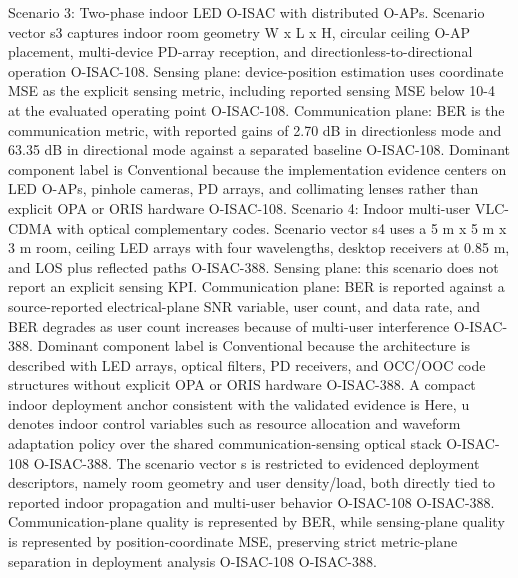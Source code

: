{}Scenario 3: Two-phase indoor LED O-ISAC with distributed O-APs.\markdownRendererHardLineBreak
{}Scenario vector s3 captures indoor room geometry W x L x H, circular ceiling O-AP placement, multi-device PD-array reception, and directionless-to-directional operation O-ISAC-108. Sensing plane: device-position estimation uses coordinate MSE as the explicit sensing metric, including reported sensing MSE below 10\markdownRendererCircumflex{}-4 at the evaluated operating point O-ISAC-108. Communication plane: BER is the communication metric, with reported gains of 2.70 dB in directionless mode and 63.35 dB in directional mode against a separated baseline O-ISAC-108. Dominant component label is Conventional because the implementation evidence centers on LED O-APs, pinhole cameras, PD arrays, and collimating lenses rather than explicit OPA or ORIS hardware O-ISAC-108.\markdownRendererParagraphSeparator
{}Scenario 4: Indoor multi-user VLC-CDMA with optical complementary codes.\markdownRendererHardLineBreak
{}Scenario vector s4 uses a 5 m x 5 m x 3 m room, ceiling LED arrays with four wavelengths, desktop receivers at 0.85 m, and LOS plus reflected paths O-ISAC-388. Sensing plane: this scenario does not report an explicit sensing KPI. Communication plane: BER is reported against a source-reported electrical-plane SNR variable, user count, and data rate, and BER degrades as user count increases because of multi-user interference O-ISAC-388. Dominant component label is Conventional because the architecture is described with LED arrays, optical filters, PD receivers, and OCC/OOC code structures without explicit OPA or ORIS hardware O-ISAC-388.\markdownRendererInterblockSeparator
{}
\markdownRendererSectionEnd \markdownRendererSectionBegin
{}\markdownRendererInterblockSeparator
{}A compact indoor deployment anchor consistent with the validated evidence is\markdownRendererInterblockSeparator
{}\markdownRendererInterblockSeparator
{}\markdownRendererInterblockSeparator
{}Here, u denotes indoor control variables such as resource allocation and waveform adaptation policy over the shared communication-sensing optical stack O-ISAC-108 O-ISAC-388. The scenario vector s is restricted to evidenced deployment descriptors, namely room geometry and user density/load, both directly tied to reported indoor propagation and multi-user behavior O-ISAC-108 O-ISAC-388. Communication-plane quality is represented by BER, while sensing-plane quality is represented by position-coordinate MSE, preserving strict metric-plane separation in deployment analysis O-ISAC-108 O-ISAC-388.\markdownRendererParagraphSeparator
